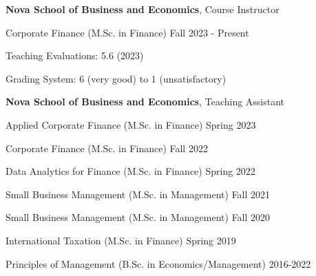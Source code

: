 \documentclass[letterpaper]{article}
\newenvironment{itemize*}{
  \begin{list}{}{
    \setlength{\leftmargin}{1.5em}
  }
}{
  \end{list}
}
\begin{document}
\begin{itemize*} 
\item \textbf{Nova School of Business and Economics}, Course Instructor
\begin{itemize*}
\item Corporate Finance (M.Sc. in Finance) \hfill Fall 2023 - Present
\begin{itemize*}
\item Teaching Evaluations: 5.6 (2023) 
\item Grading System: 6 (very good) to 1 (unsatisfactory)
\end{itemize*}
\end{itemize*}
\item \textbf{Nova School of Business and Economics}, Teaching Assistant
\begin{itemize*}
\item Applied Corporate Finance (M.Sc. in Finance) \hfill Spring 2023
\item Corporate Finance (M.Sc. in Finance) \hfill Fall 2022
\item Data Analytics for Finance (M.Sc. in Finance) \hfill Spring 2022
\item Small Business Management (M.Sc. in Management)  \hfill Fall 2021
\item Small Business Management (M.Sc. in Management)  \hfill Fall 2020
\item International Taxation (M.Sc. in Finance) \hfill Spring 2019
\item Principles of Management (B.Sc. in Economics/Management) \hfill 2016-2022
\end{itemize*}
\end{itemize*}
\end{document}
